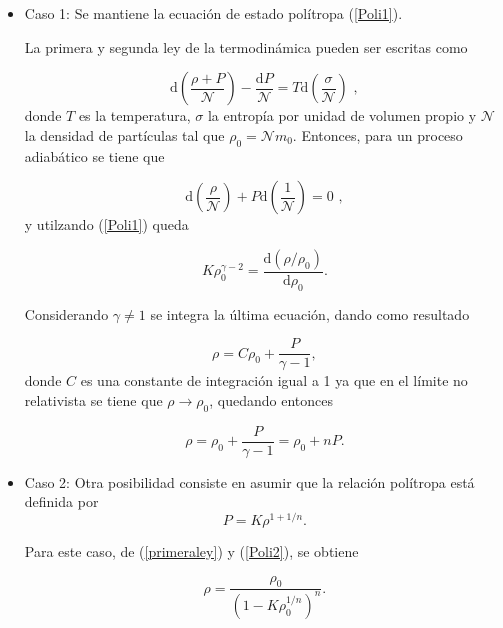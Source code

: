\documentclass[letterpaper,11pt]{article}
\begin{document}
\begin{itemize}
    \item Caso 1: Se mantiene la ecuación de estado polítropa (\ref{Poli1}).
    
    La primera y segunda ley de la termodinámica pueden ser escritas como
    
    \begin{equation*}
        \mathrm{d}\left(\frac{\rho + P}{\mathcal{N}} \right) - \frac{\mathrm{d}P}{\mathcal{N}} = T \mathrm{d}\left(\frac{\sigma}{\mathcal{N}} \right) \, \, ,
    \end{equation*}
    donde $T$ es la temperatura, $\sigma$ la entropía por unidad de volumen propio y $\mathcal{N}$ la densidad de partículas tal que $\rho_{0} = \mathcal{N} m_{0}$.
    Entonces, para un proceso adiabático se tiene que
    
    \begin{equation}
    \label{primeraley}
        \mathrm{d} \left( \frac{\rho}{\mathcal{N}} \right) + P \mathrm{d} \left(\frac{1}{\mathcal{N}}  \right) = 0 \, \, ,
    \end{equation}
    y utilzando (\ref{Poli1}) queda
    
    \begin{equation*}
        K \rho_{0}^{\gamma - 2}  = \frac{\mathrm{d}\left(\rho / \rho_{0} \right)}{\mathrm{d}\rho_{0}}.
    \end{equation*}
    
    Considerando $\gamma \neq 1$ se integra la última ecuación, dando como resultado
    
    \begin{equation*}
        \rho = C \rho_{0} + \frac{P}{\gamma - 1},
    \end{equation*}
    donde $C$ es una constante de integración igual a 1 ya que en el límite no relativista se tiene que $\rho \rightarrow \rho_{0}$, quedando entonces
    
    \begin{equation}
        \rho = \rho_{0} + \frac{P}{\gamma - 1} = \rho_{0} + n P.
    \end{equation}
    
    \item Caso 2: Otra posibilidad consiste en asumir que la relación polítropa está definida por 
    \begin{equation}
    \label{Poli2}
        P = K \rho^{1+1/n}.
    \end{equation}
    
    Para este caso, de (\ref{primeraley}) y (\ref{Poli2}), se obtiene
    
    \begin{equation*}
        \rho = \frac{\rho_{0}}{\left(1 - K \rho_{0}^{1/n} \right)^{n}}.
    \end{equation*}

\end{itemize}
\end{document}
